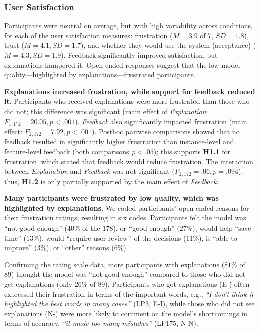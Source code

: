 \subsubsection{User Satisfaction}
Participants were neutral on average, but with high variability across conditions, for each of the user satisfaction measures: frustration ($M=3.9$ of 7, $SD=1.8$), trust ($M=4.1, SD=1.7$), and whether they would use the system (acceptance) ($M=4.3, SD=1.9$).
%
Feedback significantly improved satisfaction, but explanations hampered it. Open-ended responses suggest that the low model quality---highlighted by explanations---frustrated participants.

\textbf{Explanations increased frustration, while support for feedback reduced it}. 
%
Participants who received explanations were more frustrated than those who did not; this difference was significant (main effect of \textit{Explanation}: $F_{1, 172}=20.05, p < .001$). \textit{Feedback} also significantly impacted frustration (main effect: $F_{2, 172}=7.92, p < .001$). Posthoc pairwise comparisons showed that no feedback resulted in significantly higher frustration than instance-level and feature-level feedback (both comparisons $p<.05$); this supports \textbf{H1.1} for frustration, which stated that feedback would reduce frustration. The interaction between \textit{Explanation} and \textit{Feedback} was not significant ($F_{2, 172}=.06, p=.094$); thus, \textbf{H1.2} is only partially supported by the main effect of \textit{Feedback}. 

\textbf{Many participants were frustrated by low quality, which was highlighted by explanations}.
%
We coded participants' open-ended reasons for their frustration ratings, resulting in six codes. Participants felt the model was: ``not good enough'' ($40\%$ of the 178), or ``good enough'' ($27\%$), would help ``save time'' ($13\%$), would ``require user review'' of the decisions ($11\%$), is ``able to improve'' ($3\%$), or ``other'' reasons ($6\%$).

Confirming the rating scale data, more participants with explanations ($81\%$ of 89) thought the model was ``not good enough'' compared to those who did not get explanations (only $26\%$ of 89).
%
Participants who got explanations (E-) often expressed their frustration in terms of the important words, e.g., \textit{``I don't think it highlighted the best words in many cases''} (LP3, E-I), while those who did not see explanations (N-) were more likely to comment on the model's shortcomings in terms of accuracy, \textit{``it made too many mistakes''} (LP175, N-N). 
%

